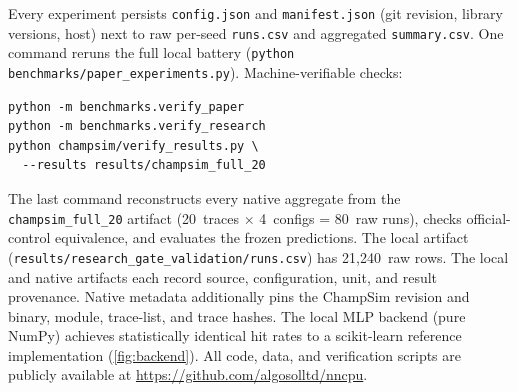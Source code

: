 \documentclass[conference]{IEEEtran}
\begin{document}
Every experiment persists \texttt{config.json} and \texttt{manifest.json}
(git revision, library versions, host) next to raw per-seed
\texttt{runs.csv} and aggregated \texttt{summary.csv}. One command reruns
the full local battery (\texttt{python benchmarks/paper\_experiments.py}).
Machine-verifiable checks:
{\small\begin{verbatim}
python -m benchmarks.verify_paper
python -m benchmarks.verify_research
python champsim/verify_results.py \
  --results results/champsim_full_20
\end{verbatim}}
The last command reconstructs every native aggregate from the
\texttt{champsim\_full\_20} artifact (20~traces $\times$ 4~configs = 80~raw runs),
checks official-control equivalence, and evaluates the frozen predictions.
The local artifact (\texttt{results/research\_gate\_validation/runs.csv})
has 21,240~raw rows. The local and native artifacts each record source,
configuration, unit, and result provenance. Native metadata additionally
pins the ChampSim revision and binary, module, trace-list, and trace hashes.
The local MLP backend (pure NumPy) achieves statistically identical hit
rates to a scikit-learn reference implementation (\cref{fig:backend}).
All code, data, and verification scripts are publicly available at
\url{https://github.com/algosolltd/nncpu}.
\end{document}
